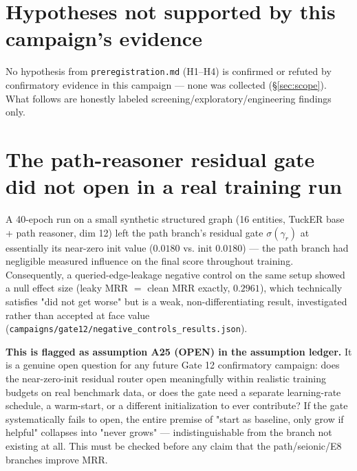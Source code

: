 \documentclass[11pt]{article}
\begin{document}

\tableofcontents

\section{Hypotheses not supported by this campaign's evidence}
No hypothesis from \texttt{preregistration.md} (H1--H4) is confirmed or refuted by confirmatory
evidence in this campaign --- none was collected (\S\ref{sec:scope}). What follows are honestly
labeled screening/exploratory/engineering findings only.

\section{The path-reasoner residual gate did not open in a real training run}
\label{sec:gate}
A 40-epoch run on a small synthetic structured graph (16 entities, TuckER base + path reasoner,
dim 12) left the path branch's residual gate $\sigma(\gamma_r)$ at essentially its near-zero
init value ($0.0180$ vs. init $0.0180$) --- the path branch had negligible measured influence on
the final score throughout training. Consequently, a queried-edge-leakage negative control on the
same setup showed a null effect size (leaky MRR $=$ clean MRR exactly, $0.2961$), which technically
satisfies "did not get worse" but is a weak, non-differentiating result, investigated rather than
accepted at face value (\texttt{campaigns/gate12/negative\_controls\_results.json}).

\textbf{This is flagged as assumption A25 (OPEN) in the assumption ledger.} It is a genuine open
question for any future Gate 12 confirmatory campaign: does the near-zero-init residual router
open meaningfully within realistic training budgets on real benchmark data, or does the gate need
a separate learning-rate schedule, a warm-start, or a different initialization to ever contribute?
If the gate systematically fails to open, the entire premise of "start as baseline, only grow if
helpful" collapses into "never grows" --- indistinguishable from the branch not existing at all.
This must be checked before any claim that the path/seionic/E8 branches improve MRR.
\end{document}
